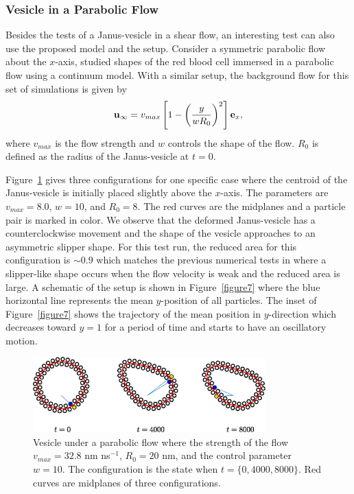 \documentclass[lineno]{jfm}
\newcommand{\uu}{\mathbf{u}}
\begin{document}
\subsubsection{Vesicle in a Parabolic Flow}

Besides the tests of a Janus-vesicle in a shear flow, an interesting test can also use the proposed model and the setup. Consider a symmetric parabolic flow about the $x$-axis, \cite{Kaoui09} studied shapes of the red blood cell immersed in a parabolic flow using a continuum model. With a similar setup, the background flow for this set of simulations is given by
\begin{equation}
\uu_\infty = v_{max}\left[ 1 - \left( \frac{y}{wR_0}\right)^2 \right]{\bf e}_x,
\end{equation}
%
where $v_{max}$ is the flow strength and $w$ controls the shape of the flow. $R_0$ is defined as the radius of the Janus-vesicle at $t=0$. 

Figure~\ref{figure6} gives three configurations for one specific case where the centroid of the Janus-vesicle is initially placed slightly above the $x$-axis. The parameters are $v_{max} = 8.0$, $w=10$, and $R_0=8$. The red curves are the midplanes and a particle pair is marked in color. We observe that the deformed 
Janus-vesicle has a counterclockwise movement and the shape of the vesicle approaches to an asymmetric
slipper shape. For this test run, the reduced area for this configuration is $\sim0.9$ which matches the previous numerical tests in \cite{Kaoui09} where a slipper-like shape occurs when the flow velocity is weak and the reduced area is large. 
A schematic of the setup is shown in Figure~\ref{figure7} where the blue horizontal line represents the mean
$y$-position of all particles. The inset of Figure~\ref{figure7} shows the trajectory of the mean position in 
$y$-direction which decreases toward $y=1$ for a period of time and starts to have an oscillatory motion. 


\begin{figure}
\centering
\includegraphics[width=0.8\textwidth]{slipper.eps}
  \caption{Vesicle under a parabolic flow where the strength of the flow $v_{max}=32.8$ nm ns$^{-1}$, $R_0 = 20$ nm,  and the control parameter $w=10$. The configuration is the state when $t=\{0, 4000, 8000\}$. Red curves are midplanes of three configurations. 
  }
    \label{figure6}
\end{figure}
\end{document}
